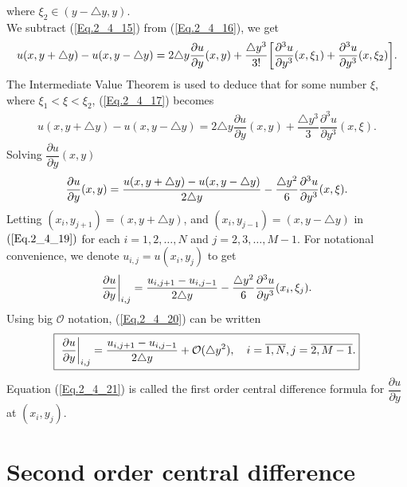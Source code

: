 where $\xi_{2} \in (y - \triangle y, y)$.
\\
We subtract (\ref{Eq.2_4_15}) from (\ref{Eq.2_4_16}), we get 
\begin{align}{\label{Eq.2_4_17}}
u(x, y + \triangle y)- u(x, y - \triangle y) = 2 \triangle y \dfrac{\partial u}{\partial y}(x, y) + \dfrac{\triangle y^{3}}{3!} \bigg [ \dfrac{\partial^3 u}{\partial y^{3}} (x,\xi_{1}) +    \dfrac{\partial^3 u}{\partial y^{3}} (x,\xi_{2})  \bigg].
\end{align}
The Intermediate Value Theorem is used to deduce that for some number $\xi$, where $\xi_{1} < \xi < \xi_{2}$, (\ref{Eq.2_4_17}) becomes
\begin{align*}%
u(x, y + \triangle y)- u(x, y - \triangle y) = 2 \triangle y \dfrac{\partial u}{\partial y}(x, y) +  \dfrac{\triangle y^{3}}{3} \dfrac{\partial^3 u}{\partial y^{3}} (x,\xi).
\end{align*}
Solving $\dfrac{\partial u}{\partial y}(x, y) $ 
\begin{align}{\label{Eq.2_4_19}}
\dfrac{\partial u}{\partial y}(x, y) = \dfrac{u(x, y + \triangle y)- u(x, y - \triangle y)}{2 \triangle y } - \dfrac{\triangle y^{2}}{6} \dfrac{\partial^3 u}{\partial y^{3}} (x,\xi).
\end{align}
Letting $(x_{i},y_{j+1})=(x,y+\triangle y)$, and $(x_{i},y_{j-1})=(x,y-\triangle y )$  in $(\ref{Eq.2_4_19})$ for each $i = 1,2,\dots,N$ and $j=2,3,\dots,M-1 $. For notational convenience, we denote $u_{i,j}= u(x_{i},y_{j})$ to get
\begin{align}{\label{Eq.2_4_20}}
\dfrac{\partial u}{\partial y}\bigg|_{i, j} = \dfrac{u_{i,j+1} - u_{i,j-1}}{2 \triangle y } - \dfrac{\triangle y^{2}}{6} \dfrac{\partial^3 u}{\partial y^{3}} (x_{i}, \xi_{j}).
\end{align}
Using big $\mathcal{O}$ notation, (\ref{Eq.2_4_20}) can be written
\begin{align}{\label{Eq.2_4_21}}
\fbox{ $ \displaystyle \dfrac{\partial u}{\partial y}\bigg|_{i, j}  = \dfrac{u_{i,j+1} - u_{i,j-1}}{2 \triangle y } + \mathcal{O}(\triangle y^{2}),\quad i =\overline{1,N}, j=\overline{2,M-1}.$}
\end{align}
Equation (\ref{Eq.2_4_21}) is called the first order central difference formula for $\dfrac{\partial u}{\partial y }$ at $(x_{i}, y_{j})$.
\section{Second order central difference}
